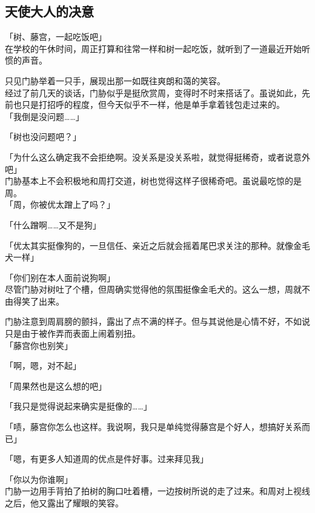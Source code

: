 \subsection{天使大人的决意}

「树、藤宫，一起吃饭吧」\\

在学校的午休时间，周正打算和往常一样和树一起吃饭，就听到了一道最近开始听惯的声音。

只见门胁举着一只手，展现出那一如既往爽朗和蔼的笑容。\\

经过了前几天的谈话，门胁似乎是挺欣赏周，变得时不时来搭话了。虽说如此，先前也只是打招呼的程度，但今天似乎不一样，他是单手拿着钱包走过来的。\\

「我倒是没问题……」

「树也没问题吧？」

「为什么这么确定我不会拒绝啊。没关系是没关系啦，就觉得挺稀奇，或者说意外吧」\\

门胁基本上不会积极地和周打交道，树也觉得这样子很稀奇吧。虽说最吃惊的是周。\\

「周，你被优太蹭上了吗？」

「什么蹭啊……又不是狗」

「优太其实挺像狗的，一旦信任、亲近之后就会摇着尾巴求关注的那种。就像金毛犬一样」

「你们别在本人面前说狗啊」\\

尽管门胁对树吐了个槽，但周确实觉得他的氛围挺像金毛犬的。这么一想，周就不由得笑了出来。

门胁注意到周肩膀的颤抖，露出了点不满的样子。但与其说他是心情不好，不如说只是由于被作弄而表面上闹着别扭。\\

「藤宫你也别笑」

「啊，嗯，对不起」

「周果然也是这么想的吧」

「我只是觉得说起来确实是挺像的……」

「啧，藤宫你怎么也这样。我说啊，我只是单纯觉得藤宫是个好人，想搞好关系而已」

「嗯，有更多人知道周的优点是件好事。过来拜见我」

「你以为你谁啊」\\

门胁一边用手背拍了拍树的胸口吐着槽，一边按树所说的走了过来。和周对上视线之后，他又露出了耀眼的笑容。

